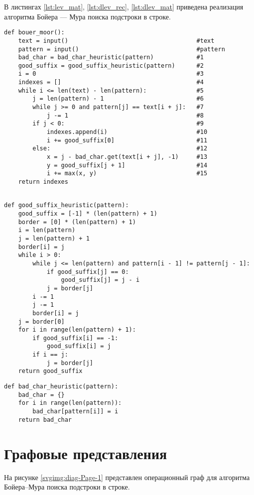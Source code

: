 В листингах \ref{lst:lev_mat}, \ref{lst:dlev_rec}, \ref{lst:dlev_mat} приведена реализация алгоритма Бойера --- Мура поиска подстроки в
строке.
\newpage
\begin{lstlisting}[label=lst:lev_mat,caption=Алгоритм Бойера--Мура поиска подстроки в строке.]
def bouer_moor():
	text = input()									  #text
	pattern = input()								  #pattern
	bad_char = bad_char_heuristic(pattern)            #1
	good_suffix = good_suffix_heuristic(pattern)      #2
	i = 0										      #3
	indexes = []									  #4
	while i <= len(text) - len(pattern):              #5
		j = len(pattern) - 1                          #6
		while j >= 0 and pattern[j] == text[i + j]:   #7
			j -= 1                                    #8
		if j < 0:                                     #9
			indexes.append(i)                         #10
			i += good_suffix[0]                       #11
		else:                                         #12
			x = j - bad_char.get(text[i + j], -1)     #13
			y = good_suffix[j + 1]                    #14
			i += max(x, y)                            #15
	return indexes                                    
	
\end{lstlisting}
\newpage
\begin{lstlisting}[label=lst:dlev_rec,caption= Эвристика хорошего суффикса]
def good_suffix_heuristic(pattern):
	good_suffix = [-1] * (len(pattern) + 1)
	border = [0] * (len(pattern) + 1)
	i = len(pattern)
	j = len(pattern) + 1
	border[i] = j
	while i > 0:
		while j <= len(pattern) and pattern[i - 1] != pattern[j - 1]:
			if good_suffix[j] == 0:
				good_suffix[j] = j - i
			j = border[j]
		i -= 1
		j -= 1
		border[i] = j
	j = border[0]
	for i in range(len(pattern) + 1):
		if good_suffix[i] == -1:
			good_suffix[i] = j
		if i == j:
			j = border[j]
	return good_suffix
\end{lstlisting}
\newpage
\begin{lstlisting}[label=lst:dlev_mat,caption=Эвристика плохого символа]
def bad_char_heuristic(pattern):
	bad_char = {}
	for i in range(len(pattern)):
		bad_char[pattern[i]] = i
	return bad_char
\end{lstlisting}
\newpage


\section{Графовые представления}

На рисунке \ref{svgimg:diag-Page-1} представлен операционный граф для алгоритма Бойера--Мура поиска подстроки в строке.

